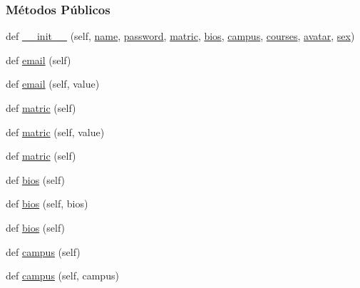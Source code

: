 \subsubsection*{Métodos Públicos}
\begin{DoxyCompactItemize}
\item 
def \hyperlink{classELO_1_1EntityUnit_1_1Professor_a5d7bff9bca06475cd645347755918fbc}{\+\_\+\+\_\+init\+\_\+\+\_\+} (self, \hyperlink{classELO_1_1EntityUnit_1_1Professor_ae85cc0fc9c64a277111a85e87efbe049}{name}, \hyperlink{classELO_1_1EntityUnit_1_1Professor_af0810854479e9f9a806eb6bfe7468e60}{password}, \hyperlink{classELO_1_1EntityUnit_1_1Professor_afc64d3f1b0e7c88530c7ee62f67ef671}{matric}, \hyperlink{classELO_1_1EntityUnit_1_1Professor_a2e403e0bfc353dcdf9988140d61d5ca7}{bios}, \hyperlink{classELO_1_1EntityUnit_1_1Professor_ad95cfc8959dcb02a6afff422703d4dde}{campus}, \hyperlink{classELO_1_1EntityUnit_1_1Professor_a6eb0d2789bb8750fb275aca0f8bb74bb}{courses}, \hyperlink{classELO_1_1EntityUnit_1_1Professor_a593a0636e87dcdd9ced2e6b7494a45dc}{avatar}, \hyperlink{classELO_1_1EntityUnit_1_1Professor_ac049dc360c4af27037158e33577288e1}{sex})
\item 
def \hyperlink{classELO_1_1EntityUnit_1_1Professor_a2d0021f6825c97388b6c816b0b48d314}{email} (self)
\item 
def \hyperlink{classELO_1_1EntityUnit_1_1Professor_aea4d8065077324c3cd8c2a1ffbca4001}{email} (self, value)
\item 
def \hyperlink{classELO_1_1EntityUnit_1_1Professor_a4cb30b6fe7124e7d7ff3b4619d22517c}{matric} (self)
\item 
def \hyperlink{classELO_1_1EntityUnit_1_1Professor_a9e466ef38ddb7c86e86f129295c6a78e}{matric} (self, value)
\item 
def \hyperlink{classELO_1_1EntityUnit_1_1Professor_a4cb30b6fe7124e7d7ff3b4619d22517c}{matric} (self)
\item 
def \hyperlink{classELO_1_1EntityUnit_1_1Professor_ae377af0bf7c90bd45e8a14a72d2cb807}{bios} (self)
\item 
def \hyperlink{classELO_1_1EntityUnit_1_1Professor_a37c9cbf2419bc007ae055afcdba5549f}{bios} (self, bios)
\item 
def \hyperlink{classELO_1_1EntityUnit_1_1Professor_ae377af0bf7c90bd45e8a14a72d2cb807}{bios} (self)
\item 
def \hyperlink{classELO_1_1EntityUnit_1_1Professor_ab460e53bc057c0a793757ade5c83c45b}{campus} (self)
\item 
def \hyperlink{classELO_1_1EntityUnit_1_1Professor_af9fbda85b0ef5a28c879da745d5f24ba}{campus} (self, campus)

\end{DoxyCompactItemize}
